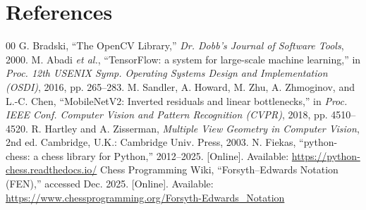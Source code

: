 \documentclass[conference]{IEEEtran}
\begin{document}
\section*{References}

\begin{thebibliography}{00}
 G. Bradski, ``The OpenCV Library,'' \textit{Dr. Dobb's Journal of Software Tools}, 2000.
 M. Abadi \textit{et al.}, ``TensorFlow: a system for large-scale machine learning,'' in \textit{Proc. 12th USENIX Symp. Operating Systems Design and Implementation (OSDI)}, 2016, pp. 265--283.
 M. Sandler, A. Howard, M. Zhu, A. Zhmoginov, and L.-C. Chen, ``MobileNetV2: Inverted residuals and linear bottlenecks,'' in \textit{Proc. IEEE Conf. Computer Vision and Pattern Recognition (CVPR)}, 2018, pp. 4510--4520.
 R. Hartley and A. Zisserman, \textit{Multiple View Geometry in Computer Vision}, 2nd ed. Cambridge, U.K.: Cambridge Univ. Press, 2003.
 N. Fiekas, ``python-chess: a chess library for Python,'' 2012--2025. [Online]. Available: \url{https://python-chess.readthedocs.io/}
 Chess Programming Wiki, ``Forsyth--Edwards Notation (FEN),'' accessed Dec. 2025. [Online]. Available: \url{https://www.chessprogramming.org/Forsyth-Edwards_Notation}
\end{thebibliography}
\end{document}
